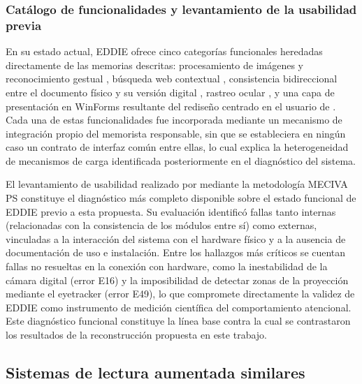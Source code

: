 \subsubsection{Catálogo de funcionalidades y levantamiento de la usabilidad previa}
En su estado actual, EDDIE ofrece cinco categorías funcionales heredadas directamente de las memorias descritas: procesamiento de imágenes y reconocimiento gestual \citep{contreras2019desarrollo}, búsqueda web contextual \citep{montanares2019desarrollo}, consistencia bidireccional entre el documento físico y su versión digital \citep{pezoa2020implementacion}, rastreo ocular \citep{estay2020integracion}, y una capa de presentación en WinForms resultante del rediseño centrado en el usuario de \cite{santibanez2020rediseno}. Cada una de estas funcionalidades fue incorporada mediante un mecanismo de integración propio del memorista responsable, sin que se estableciera en ningún caso un contrato de interfaz común entre ellas, lo cual explica la heterogeneidad de mecanismos de carga identificada posteriormente en el diagnóstico del sistema. 

El levantamiento de usabilidad realizado por \cite{ibaceta2023evaluacion} mediante la metodología MECIVA PS constituye el diagnóstico más completo disponible sobre el estado funcional de EDDIE previo a esta propuesta. Su evaluación identificó fallas tanto internas (relacionadas con la consistencia de los módulos entre sí) como externas, vinculadas a la interacción del sistema con el hardware físico y a la ausencia de documentación de uso e instalación. Entre los hallazgos más críticos se cuentan fallas no resueltas en la conexión con hardware, como la inestabilidad de la cámara digital (error E16) y la imposibilidad de detectar zonas de la proyección mediante el eyetracker (error E49), lo que compromete directamente la validez de EDDIE como instrumento de medición científica del comportamiento atencional. Este diagnóstico funcional constituye la línea base contra la cual se contrastaron los resultados de la reconstrucción propuesta en este trabajo.

\subsection{Sistemas de lectura aumentada similares}

